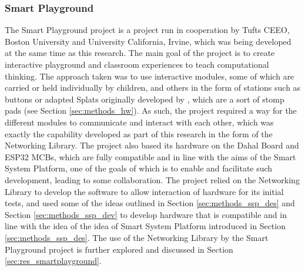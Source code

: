 \subsubsection{\label{sec:methods_smart_playground}Smart Playground}
The Smart Playground project is a project run in cooperation by Tufts CEEO, Boston University and University California, Irvine, which was being developed at the same time as this research. The main goal of the project is to create interactive playground and classroom experiences to teach computational thinking. The approach taken was to use interactive modules, some of which are carried or held individually by children, and others in the form of stations such as buttons or adapted Splats originally developed by \citet[]{unruly_studios_unruly_nodate}, which are a sort of stomp pads (see Section \ref{sec:methods_hw}). As such, the project required a way for the different modules to communicate and interact with each other, which was exactly the capability developed as part of this research in the form of the Networking Library. The project also based its hardware on the Dahal Board and ESP32 MCBs, which are fully compatible and in line with the aims of the Smart System Platform, one of the goals of which is to enable and facilitate such development, leading to some collaboration. The project relied on the Networking Library to develop the software to allow interaction of hardware for its initial tests, and used some of the ideas outlined in Section \ref{sec:methods_ssp_des} and Section \ref{sec:methods_ssp_dev} to develop hardware that is compatible and in line with the idea of the idea of Smart System Platform introduced in Section \ref{sec:methods_ssp_des}. The use of the Networking Library by the Smart Playground project is further explored and discussed in Section \ref{sec:res_smartplayground}.
